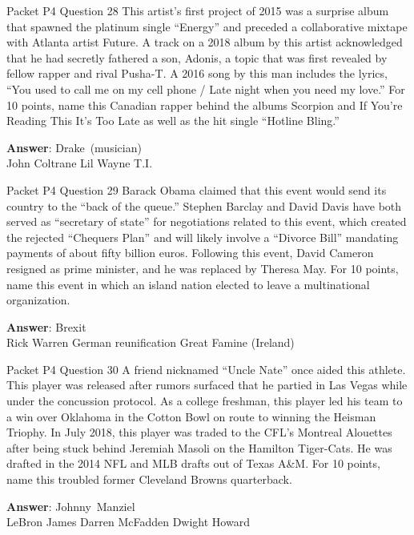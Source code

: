 \begin{frame}{Packet P4 Question 28}
This artist's first project of 2015 was a surprise album that spawned the platinum single ``Energy'' and preceded a collaborative mixtape with Atlanta artist Future. A track on a 2018 album by this artist acknowledged that he had secretly fathered a son, Adonis, a   topic that was first revealed by fellow rapper and rival Pusha-T.   A 2016 song by this man includes the lyrics, ``You used to call me on my cell phone / Late night when you need my   love.'' For 10 points, name this Canadian rapper behind the albums   Scorpion and If You're Reading This It's Too Late as well as the hit single ``Hotline Bling.''

\textbf{Answer}: Drake\ (musician)\\
 John Coltrane
 Lil Wayne
 T.I.
\end{frame}

\begin{frame}{Packet P4 Question 29}
Barack Obama claimed that   this event would send its country to the ``back of the queue.'' Stephen Barclay and David Davis have both served as ``secretary of state'' for negotiations related to this event, which created the rejected ``Chequers Plan''   and will likely involve a ``Divorce Bill'' mandating payments of about fifty billion euros. Following this event, David Cameron resigned as prime minister, and   he was replaced by Theresa May. For 10 points, name this event in which an island nation elected to leave a multinational organization.  

\textbf{Answer}: Brexit\\
 Rick Warren
 German reunification
 Great Famine (Ireland)
\end{frame}

\begin{frame}{Packet P4 Question 30}
A friend nicknamed ``Uncle Nate'' once aided this athlete. This player was released after rumors surfaced that he partied in Las Vegas while under the concussion protocol. As a college freshman, this player led his team to a win over Oklahoma in   the Cotton Bowl on route to winning the Heisman Triophy. In July 2018, this player was traded to the CFL's Montreal Alouettes after being stuck behind Jeremiah Masoli on the Hamilton Tiger-Cats. He was drafted in the 2014 NFL and MLB drafts out of Texas A\&M. For 10 points, name this troubled former Cleveland Browns   quarterback.    

\textbf{Answer}: Johnny\ Manziel\\
 LeBron James
 Darren McFadden
 Dwight Howard
\end{frame}

